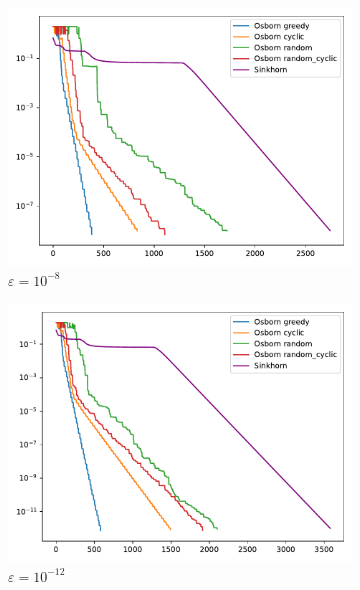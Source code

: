 \begin{figure}[H]
\begin{subfigure}[b]{.18\textwidth}
        \centering
        \includegraphics[width=\textwidth]{figures/dist2_0.001/osborn_vs_sinkhorn_dist2_0.001_1e-08}
        \caption{\(\varepsilon = 10^{-8}\)}
    \end{subfigure}
    \hfill
    \begin{subfigure}[b]{.18\textwidth}
        \centering
        \includegraphics[width=\textwidth]{figures/dist2_0.001/osborn_vs_sinkhorn_dist2_0.001_1e-12}
        \caption{\(\varepsilon = 10^{-12}\)}
    \end{subfigure}
    \hfill
    \begin{subfigure}[b]{.18\textwidth}
        \centering

\end{subfigure}
\end{figure}
